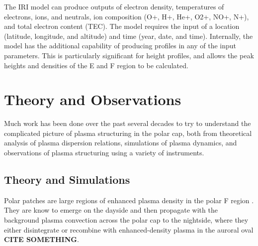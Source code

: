 The IRI model can produce outputs of electron density, temperatures of electrons, ions, and neutrals, ion composition (O+, H+, He+, O2+, NO+, N+), and total electron content (TEC).  The model requires the input of a location (latitude, longitude, and altitude) and time (year, date, and time).  Internally, the model has the additional capability of producing profiles in any of the input parameters.  This is particularly significant for height profiles, and allows the peak heights and densities of the E and F region to be calculated.


\section{Theory and Observations}
Much work has been done over the past several decades to try to understand the complicated picture of plasma structuring in the polar cap, both from theoretical analysis of plasma dispersion relations, simulations of plasma dynamics, and observations of plasma structuring using a variety of instruments.

\subsection{Theory and Simulations}

Polar patches are large regions of enhanced plasma density in the polar F region \citep[][e.g.]{Weber1984,Buchau1985}.  They are know to emerge on the dayside and then propagate with the background plasma convection across the polar cap to the nightside, where they either disintegrate or recombine with enhanced-density plasma in the auroral oval \textbf{CITE SOMETHING}.

